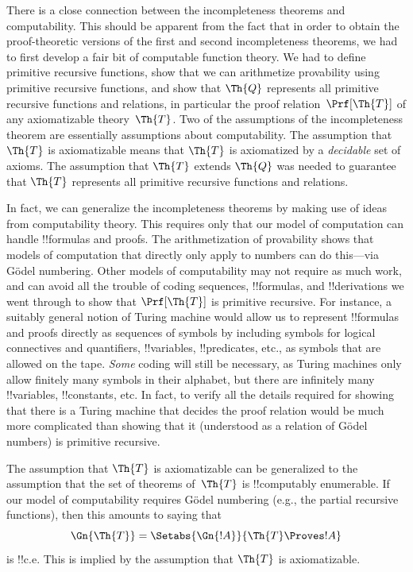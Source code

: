 \documentclass[../../../include/open-logic-section]{subfiles}
\begin{document}

There is a close connection between the incompleteness theorems and
computability. This should be apparent from the fact that in order to
obtain the proof-theoretic versions of the first and second
incompleteness theorems, we had to first develop a fair bit of
computable function theory. We had to define primitive recursive
functions, show that we can arithmetize provability using primitive
recursive functions, and show that $\Th{Q}$ represents all primitive
recursive functions and relations, in particular the proof
relation~$\Prf[\Th{T}]$ of any axiomatizable theory~$\Th{T}$. Two of the
assumptions of the incompleteness theorem are essentially assumptions
about computability. The assumption that $\Th{T}$ is axiomatizable
means that $\Th{T}$ is axiomatized by a \emph{decidable} set of
axioms. The assumption that $\Th{T}$ extends $\Th{Q}$ was needed to
guarantee that $\Th{T}$ represents all primitive recursive functions
and relations.

In fact, we can generalize the incompleteness theorems by making use
of ideas from computability theory. This requires only that our model
of computation can handle !!{formula}s and proofs. The arithmetization of
provability shows that models of computation that directly only apply
to numbers can do this---via G\"odel numbering. Other models of
computability may not require as much work, and can avoid all the
trouble of coding sequences, !!{formula}s, and !!{derivation}s we went through
to show that $\Prf[\Th{T}]$ is primitive recursive. For instance, a
suitably general notion of Turing machine would allow us to represent
!!{formula}s and proofs directly as sequences of symbols by including
symbols for logical connectives and quantifiers, !!{variable}s,
!!{predicate}s, etc., as symbols that are allowed on the tape.
\emph{Some} coding will still be necessary, as Turing machines only
allow finitely many symbols in their alphabet, but there are
infinitely many !!{variable}s, !!{constant}s, etc. In fact, to verify
all the details required for showing that there is a Turing machine
that decides the proof relation would be much more complicated than
showing that it (understood as a relation of G\"odel numbers) is
primitive recursive.

The assumption that $\Th{T}$ is axiomatizable can be generalized to
the assumption that the set of theorems of~$\Th{T}$ is !!{computably
enumerable}. If our model of computability requires G\"odel numbering
(e.g., the partial recursive functions), then this amounts to saying
that 
\[
  \Gn{\Th{T}} = \Setabs{\Gn{!A}}{\Th{T} \Proves !A}
\]
is !!{c.e.} This is implied by the assumption that $\Th{T}$ is
axiomatizable.
\end{document}
